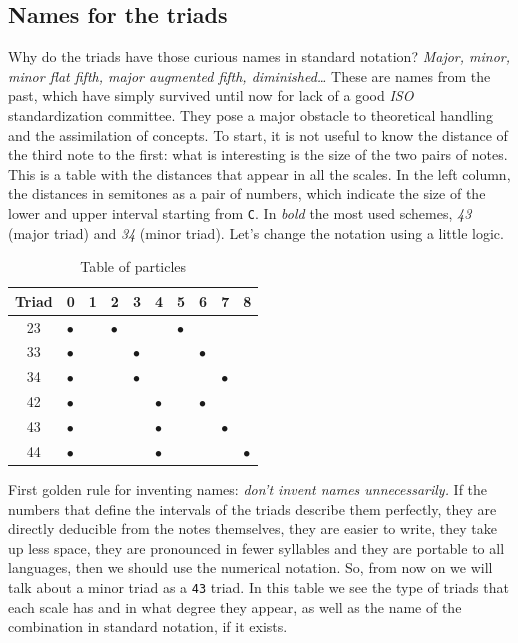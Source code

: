 \documentclass[]{report}
\begin{document}
\subsection{Names for the triads}
Why do the triads have those curious names in standard notation? \emph{Major, minor, minor flat fifth, major augmented fifth, diminished\ldots{}}
These are names from the past, which have simply survived until now for lack of a good \emph{ISO} standardization committee. They pose a major obstacle to theoretical handling and the assimilation of concepts.
To start, it is not useful to know the distance of the third note to the first: what is interesting is the size of the two pairs of notes. This is a table with the distances that appear in all the scales. In the left column, the distances in semitones as a pair of numbers, which indicate the size of the lower and upper interval starting from \texttt{C}. In \emph{bold} the most used schemes, \emph{43} (major triad) and \emph{34} (minor triad).
Let's change the notation using a little logic.
\begin{table}[ht]
\centering
\begin{tabularx}{\textwidth}{|c|X|X|X|X|X|X|X|X|X|}
\hline
Triad & 0 & 1& 2 & 3 & 4 & 5 & 6 & 7 & 8 \\
\hline
23 & $\bullet$& & $\bullet$ & & & $\bullet$ & & & \\
\hline
33 & $\bullet$& & & $\bullet$ & & & $\bullet$ & & \\
\hline
34 & $\bullet$& & & $\bullet$ & & & & $\bullet$ & \\
\hline
42 & $\bullet$& & & & $\bullet$ & & $\bullet$ & & \\
\hline
43 & $\bullet$& & & & $\bullet$ & & & $\bullet$ & \\
\hline
44 & $\bullet$& & & & $\bullet$ & & & & $\bullet$ \\
\hline
\end{tabularx}
\caption{Table of particles}\label{tab:particulas}
\end{table}
First golden rule for inventing names: \emph{don't invent names unnecessarily.}
If the numbers that define the intervals of the triads describe them perfectly, they are directly deducible from the notes themselves, they are easier to write, they take up less space, they are pronounced in fewer syllables and they are portable to all languages, then we should use the numerical notation.
So, from now on we will talk about a minor triad as a \texttt{43} triad.
In this table we see the type of triads that each scale has and in what degree they appear, as well as the name of the combination in standard notation, if it exists. 
\end{document}
